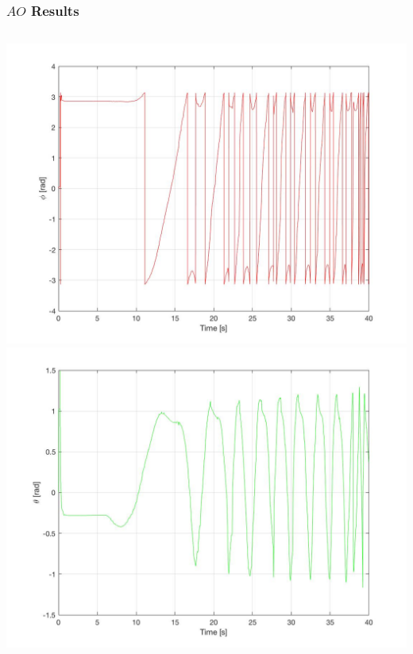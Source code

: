 \documentclass{beamer}
\begin{document}
			

	\begin{frame}
		\frametitle{$AO$ Results}
		\begin{columns}[t]
			\centering
			\includegraphics[scale= 0.12]{phi_angle.jpg}\\
			\includegraphics[scale= 0.12]{theta_angle.jpg}

\end{columns}
\end{frame}
\end{document}
